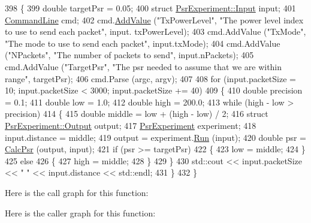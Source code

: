 \begin{DoxyCode}
398 \{
399   \textcolor{keywordtype}{double} targetPsr = 0.05;
400   \textcolor{keyword}{struct }\hyperlink{structPsrExperiment_1_1Input}{PsrExperiment::Input} input;
401   \hyperlink{classns3_1_1CommandLine}{CommandLine} cmd;
402   cmd.\hyperlink{classns3_1_1CommandLine_addcfb546c7ad4c8bd0965654d55beb8e}{AddValue} (\textcolor{stringliteral}{"TxPowerLevel"}, \textcolor{stringliteral}{"The power level index to use to send each packet"}, input.
      txPowerLevel);
403   cmd.AddValue (\textcolor{stringliteral}{"TxMode"}, \textcolor{stringliteral}{"The mode to use to send each packet"}, input.txMode);
404   cmd.AddValue (\textcolor{stringliteral}{"NPackets"}, \textcolor{stringliteral}{"The number of packets to send"}, input.nPackets);
405   cmd.AddValue (\textcolor{stringliteral}{"TargetPsr"}, \textcolor{stringliteral}{"The psr needed to assume that we are within range"}, targetPsr);
406   cmd.Parse (argc, argv);
407 
408   \textcolor{keywordflow}{for} (input.packetSize = 10; input.packetSize < 3000; input.packetSize += 40)
409     \{
410       \textcolor{keywordtype}{double} precision = 0.1;
411       \textcolor{keywordtype}{double} low = 1.0;
412       \textcolor{keywordtype}{double} high = 200.0;
413       \textcolor{keywordflow}{while} (high - low > precision)
414         \{
415           \textcolor{keywordtype}{double} middle = low + (high - low) / 2;
416           \textcolor{keyword}{struct }\hyperlink{structPsrExperiment_1_1Output}{PsrExperiment::Output} output;
417           \hyperlink{classPsrExperiment}{PsrExperiment} experiment;
418           input.distance = middle;
419           output = experiment.\hyperlink{classPsrExperiment_abf2ccba462f7c6741034fcadcdd45900}{Run} (input);
420           \textcolor{keywordtype}{double} psr = \hyperlink{wifi-phy-test_8cc_a90b8a55ba4147ccdea2d6387caf9f032}{CalcPsr} (output, input);
421           \textcolor{keywordflow}{if} (psr >= targetPsr)
422             \{
423               low = middle;
424             \}
425           \textcolor{keywordflow}{else}
426             \{
427               high = middle;
428             \}
429         \}
430       std::cout << input.packetSize << \textcolor{stringliteral}{" "} << input.distance << std::endl;
431     \}
432 \}
\end{DoxyCode}


Here is the call graph for this function\+:




Here is the caller graph for this function\+:


